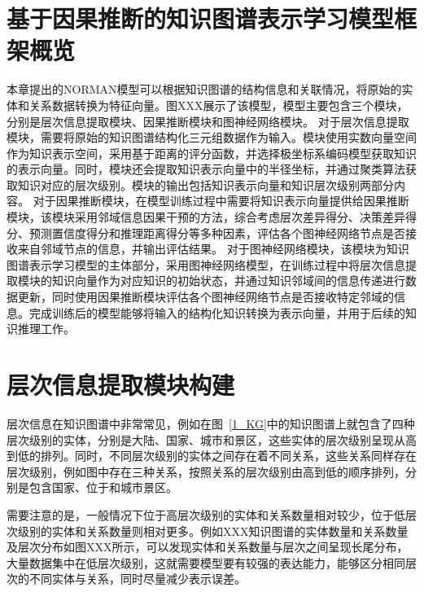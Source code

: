 \documentclass[algorithmlist, AutoFakeBold, AutoFakeSlant, figurelist, tablelist, nomlist, masters]{seuthesix}
\begin{document}
\section{基于因果推断的知识图谱表示学习模型框架概览}
本章提出的NORMAN模型可以根据知识图谱的结构信息和关联情况，将原始的实体和关系数据转换为特征向量。图XXX展示了该模型，模型主要包含三个模块，分别是层次信息提取模块、因果推断模块和图神经网络模块。
对于层次信息提取模块，需要将原始的知识图谱结构化三元组数据作为输入。模块使用实数向量空间作为知识表示空间，采用基于距离的评分函数，并选择极坐标系编码模型获取知识的表示向量。同时，模块还会提取知识表示向量中的半径坐标，并通过聚类算法获取知识对应的层次级别。模块的输出包括知识表示向量和知识层次级别两部分内容。
对于因果推断模块，在模型训练过程中需要将知识表示向量提供给因果推断模块，该模块采用邻域信息因果干预的方法，综合考虑层次差异得分、决策差异得分、预测置信度得分和推理距离得分等多种因素，评估各个图神经网络节点是否接收来自邻域节点的信息，并输出评估结果。
对于图神经网络模块，该模块为知识图谱表示学习模型的主体部分，采用图神经网络模型，在训练过程中将层次信息提取模块的知识向量作为对应知识的初始状态，并通过知识邻域间的信息传递进行数据更新，同时使用因果推断模块评估各个图神经网络节点是否接收特定邻域的信息。完成训练后的模型能够将输入的结构化知识转换为表示向量，并用于后续的知识推理工作。

\section{层次信息提取模块构建}
层次信息在知识图谱中非常常见，例如在图~\ref{1_KG}中的知识图谱上就包含了四种层次级别的实体，分别是大陆、国家、城市和景区，这些实体的层次级别呈现从高到低的排列。同时，不同层次级别的实体之间存在着不同关系，这些关系同样存在层次级别，例如图中存在三种关系，按照关系的层次级别由高到低的顺序排列，分别是包含国家、位于和城市景区。

需要注意的是，一般情况下位于高层次级别的实体和关系数量相对较少，位于低层次级别的实体和关系数量则相对更多。例如XXX知识图谱的实体数量和关系数量及层次分布如图XXX所示，可以发现实体和关系数量与层次之间呈现长尾分布，大量数据集中在低层次级别，这就需要模型要有较强的表达能力，能够区分相同层次的不同实体与关系，同时尽量减少表示误差。
\end{document}
